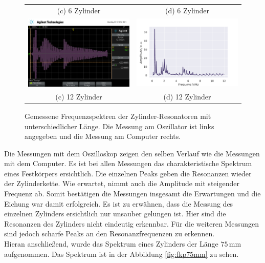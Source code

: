 \begin{figure}[H]
\begin{tabular}{cc}
    (c) 6 Zylinder & (d) 6 Zylinder \\[6pt]
    \includegraphics[width=65mm]{Daten/Zyinder/Zylinder_12.png} &   \includegraphics[width=65mm]{Daten/Zyinder/Zylinder_12.pdf} \\
    (c) 12 Zylinder & (d) 12 Zylinder \\[6pt]
    \end{tabular}
    \caption{Gemessene Frequenzspektren der Zylinder-Resonatoren mit unterschiedlicher Länge. Die Messung am Oszillator ist links angegeben und die Messung am Computer rechts. } 
    \label{fig:zyl1-6-12}
\end{figure}

Die Messungen mit dem Oszilloskop zeigen den selben Verlauf wie die Messungen mit dem Computer. Es ist bei allen Messungen das charakteristische Spektrum eines Festkörpers ersichtlich. Die einzelnen Peaks geben die Resonanzen wieder der Zylinderkette. Wie erwartet, nimmt auch die Amplitude mit steigender Frequenz ab. 
Somit bestätigen die Messungen insgesamt die Erwartungen und die Eichung war damit erfolgreich. 
Es ist zu erwähnen, dass die Messung des einzelnen Zylinders ersichtlich nur unsauber gelungen ist. Hier sind die Resonanzen des Zylinders nicht eindeutig erkennbar. Für die weiteren Messungen sind jedoch scharfe Peaks an den Resonanzfrequenzen zu erkennen. \\
Hieran anschließend, wurde das Spektrum eines Zylinders der Länge $75\,\si{\milli\metre}$ aufgenommen. Das Spektrum ist in der Abbildung \ref{fig:fkp75mm} zu sehen.

